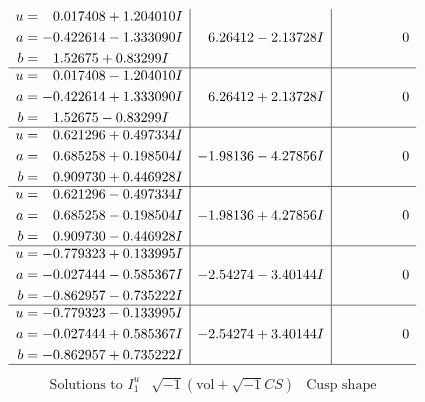 \documentclass[1p]{elsarticle_modified}
\theoremstyle{definition}
\newcommand{\I}{\sqrt{-1}}
\begin{document}
$$\begin{array}{c|c|c}
\begin{aligned}
u &= \phantom{-}0.017408 + 1.204010 I \\
a &= -0.422614 - 1.333090 I \\
b &= \phantom{-}1.52675 + 0.83299 I\end{aligned}
 & \phantom{-}6.26412 - 2.13728 I & \phantom{-0.000000 } 0 \\ \hline\begin{aligned}
u &= \phantom{-}0.017408 - 1.204010 I \\
a &= -0.422614 + 1.333090 I \\
b &= \phantom{-}1.52675 - 0.83299 I\end{aligned}
 & \phantom{-}6.26412 + 2.13728 I & \phantom{-0.000000 } 0 \\ \hline\begin{aligned}
u &= \phantom{-}0.621296 + 0.497334 I \\
a &= \phantom{-}0.685258 + 0.198504 I \\
b &= \phantom{-}0.909730 + 0.446928 I\end{aligned}
 & -1.98136 - 4.27856 I & \phantom{-0.000000 } 0 \\ \hline\begin{aligned}
u &= \phantom{-}0.621296 - 0.497334 I \\
a &= \phantom{-}0.685258 - 0.198504 I \\
b &= \phantom{-}0.909730 - 0.446928 I\end{aligned}
 & -1.98136 + 4.27856 I & \phantom{-0.000000 } 0 \\ \hline\begin{aligned}
u &= -0.779323 + 0.133995 I \\
a &= -0.027444 - 0.585367 I \\
b &= -0.862957 - 0.735222 I\end{aligned}
 & -2.54274 - 3.40144 I & \phantom{-0.000000 } 0 \\ \hline\begin{aligned}
u &= -0.779323 - 0.133995 I \\
a &= -0.027444 + 0.585367 I \\
b &= -0.862957 + 0.735222 I\end{aligned}
 & -2.54274 + 3.40144 I & \phantom{-0.000000 } 0\\
 \hline 
 \end{array}$$\newpage$$\begin{array}{c|c|c}  
\text{Solutions to }I^u_{1}& \I (\text{vol} + \sqrt{-1}CS) & \text{Cusp shape}\\
 \hline 
\begin{aligned}

\end{aligned}
\end{array}$$
\end{document}
